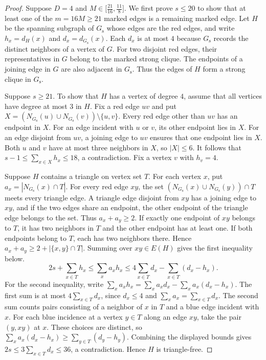 \documentclass[preprint,11pt,numbers]{elsarticle-arxiv}
\numberwithin{equation}{section}
\theoremstyle{definition}
\begin{document}
\begin{proof}
Suppose $D=4$ and $M\in\bigl[\frac{21}{16},\frac{11}{8}\bigr]$.
We first prove $s\leq20$ to show that at least one of the
$m=16M\geq21$ marked edges is a remaining marked edge.
Let $H$ be the spanning subgraph
of $G_{\mathrm s}$ whose edges are the red edges, and write
$h_x=d_H(x)$ and $d_x=d_{G_{\mathrm s}}(x)$. Each $d_x$ is at
most $4$ because $G_{\mathrm s}$ records the distinct neighbors of
a vertex of $G$. For two disjoint red edges, their representatives
in $G$ belong to the marked strong clique. The endpoints of a joining
edge in $G$ are also adjacent in $G_{\mathrm s}$. Thus the edges
of $H$ form a strong clique in $G_{\mathrm s}$.

Suppose $s\geq21$. To show that $H$ has a vertex of degree $4$,
assume that all vertices have degree at most $3$ in $H$.
Fix a red edge $uv$ and put
$X=(N_{G_{\mathrm s}}(u)\cup N_{G_{\mathrm s}}(v))\setminus\{u,v\}$.
Every red edge other than $uv$ has an endpoint in $X$.
For an edge incident with $u$ or $v$, its other endpoint lies in
$X$. For an edge disjoint from $uv$, a joining edge to $uv$
ensures that one endpoint lies in $X$. Both $u$ and $v$ have at
most three neighbors in $X$, so $|X|\leq6$. It follows that
$s-1\leq\sum_{x\in X}h_x\leq18$, a contradiction.
Fix a vertex $v$ with $h_v=4$.

Suppose $H$ contains a triangle on vertex set $T$. For each vertex
$x$, put $a_x=|N_{G_{\mathrm s}}(x)\cap T|$. For every red edge
$xy$, the set $(N_{G_{\mathrm s}}(x)\cup N_{G_{\mathrm s}}(y))\cap T$
meets every triangle edge. A triangle edge disjoint from $xy$
has a joining edge to $xy$, and if the two edges share an endpoint,
the other endpoint of the triangle edge belongs to the set.
Thus $a_x+a_y\geq2$. If exactly one endpoint of $xy$ belongs to
$T$, it has two neighbors in $T$ and the other endpoint has at
least one. If both endpoints belong to $T$, each has two neighbors
there. Hence $a_x+a_y\geq2+|\{x,y\}\cap T|$. Summing over
$xy\in E(H)$ gives the first inequality below.
\[
 2s+\sum_{x\in T}h_x
 \leq\sum_x a_xh_x
 \leq4\sum_{x\in T}d_x-\sum_{x\in T}(d_x-h_x).
\]
For the second inequality, write
$\sum_x a_xh_x=\sum_x a_xd_x-\sum_x a_x(d_x-h_x)$.
The first sum is at most $4\sum_{x\in T}d_x$, since $d_x\leq4$
and $\sum_x a_x=\sum_{x\in T}d_x$. The second sum counts pairs
consisting of a neighbor of $x$ in $T$ and a blue edge incident
with $x$. For each blue incidence at a vertex $y\in T$ along an edge
$xy$, take the pair $(y,xy)$ at $x$. These choices are distinct, so
$\sum_x a_x(d_x-h_x)\geq\sum_{y\in T}(d_y-h_y)$.
Combining the displayed bounds gives $2s\leq3\sum_{x\in T}d_x\leq36$,
a contradiction. Hence $H$ is triangle-free.


\end{proof}
\end{document}
